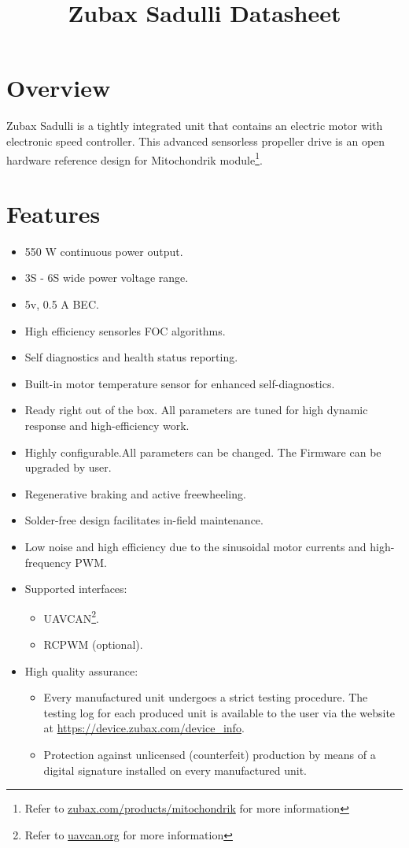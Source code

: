 \documentclass{zubaxdoc}
\title{Zubax Sadulli Datasheet}
\begin{document}
\begin{titlepage}
\section*{Overview}
Zubax Sadulli is a tightly integrated unit that contains an electric motor with electronic speed controller. This advanced  sensorless propeller drive is an open hardware reference design for Mitochondrik module\footnote{Refer to \url{zubax.com/products/mitochondrik} for more information}.
\section*{Features}

\begin{itemize}
    \item 550 W continuous power output.
    \item 3S - 6S wide power voltage range.
    \item 5v, 0.5 A BEC.
    \item High efficiency sensorles FOC algorithms.
    \item Self diagnostics and health status reporting.
    \item Built-in motor temperature sensor for enhanced \allowbreak{}self-diagnostics.
    \item Ready right out of the box. All parameters are tuned for high dynamic response and high-efficiency work.      
    \item Highly configurable.All parameters can be changed. The Firmware can be upgraded by user.     
    \item Regenerative braking and active freewheeling. 
    \item Solder-free design facilitates in-field maintenance.
    \item Low noise and high efficiency due to the sinusoidal motor currents and high-frequency PWM.
    \item Supported interfaces:
    \begin{itemize}
        \item UAVCAN\footnote{Refer to \url{uavcan.org} for more information}.
        \item RCPWM (optional).
    \end{itemize}
    \item High quality assurance:
    \begin{itemize}
        \item Every manufactured unit undergoes a strict testing procedure.
        The testing log for each produced unit is available to the user via the website at
        \url{https://device.zubax.com/device_info}.
        \item Protection against unlicensed (counterfeit) production by means of a digital signature
        installed on every manufactured unit.
     \end{itemize}
\end{itemize}


\end{titlepage}
\end{document}
